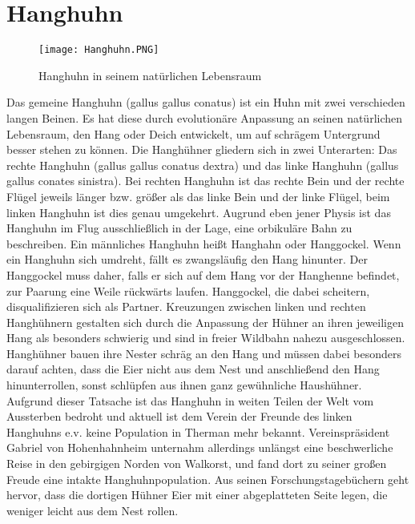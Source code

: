 \documentclass[a4paper]{article}
\begin{document}
\section*{Hanghuhn}
\begin{figure}[H]
\centering
\texttt{[image: Hanghuhn.PNG]}
\caption*{Hanghuhn in seinem natürlichen Lebensraum}
\label{fig:hanghuhn}
\end{figure}
Das gemeine Hanghuhn (gallus gallus conatus) ist ein Huhn mit zwei verschieden
langen Beinen. Es hat diese durch evolutionäre Anpassung an seinen natürlichen
Lebensraum, den Hang oder Deich entwickelt, um auf schrägem Untergrund besser
stehen zu können. Die Hanghühner gliedern sich in
zwei Unterarten: Das rechte Hanghuhn (gallus gallus conatus dextra) und das
linke Hanghuhn (gallus gallus conates sinistra). Bei rechten Hanghuhn ist das
rechte Bein und der rechte Flügel jeweils länger bzw. größer als das linke
Bein und der linke Flügel, beim linken Hanghuhn ist dies genau umgekehrt.
Augrund eben jener Physis ist das Hanghuhn im Flug ausschließlich in der Lage,
eine orbikuläre Bahn zu beschreiben. Ein männliches Hanghuhn heißt Hanghahn
oder Hanggockel. Wenn ein Hanghuhn sich umdreht, fällt es zwangsläufig den
Hang hinunter. Der Hanggockel muss daher, falls er sich auf dem Hang vor der
Hanghenne befindet, zur Paarung eine Weile rückwärts laufen. Hanggockel, die
dabei scheitern, disqualifizieren sich als Partner. Kreuzungen zwischen linken
und rechten Hanghühnern gestalten sich durch die Anpassung der Hühner an ihren
jeweiligen Hang als besonders schwierig und sind in freier Wildbahn nahezu
ausgeschlossen.\\
Hanghühner bauen ihre Nester schräg an den Hang und müssen dabei besonders
darauf achten, dass die Eier nicht aus dem Nest und anschließend den Hang
hinunterrollen, sonst schlüpfen aus ihnen ganz gewühnliche Haushühner.
Aufgrund dieser Tatsache ist das Hanghuhn in weiten Teilen der Welt vom
Aussterben bedroht und aktuell ist dem Verein der Freunde des linken Hanghuhns
e.v. keine Population in Therman mehr bekannt. Vereinspräsident Gabriel von
Hohenhahnheim unternahm allerdings unlängst eine beschwerliche Reise in den
gebirgigen Norden von Walkorst, und fand dort zu seiner großen Freude eine
intakte Hanghuhnpopulation. Aus seinen Forschungstagebüchern geht hervor, dass
die dortigen Hühner Eier mit einer abgeplatteten Seite legen, die weniger
leicht aus dem Nest rollen.
\end{document}
